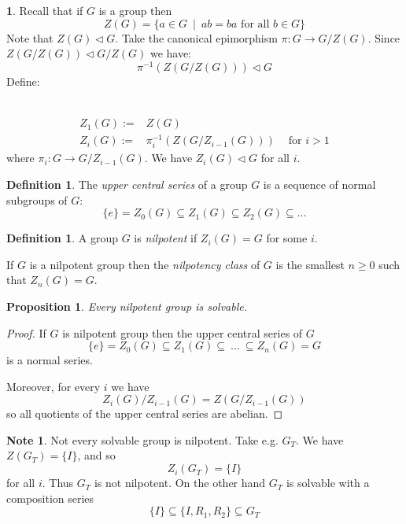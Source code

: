 \documentclass[12pt, letterpaper, oneside]{article}
\theoremstyle{plain}
\newtheorem{proposition}[theorem]{Proposition}
\theoremstyle{definition}
\newtheorem{definition}[theorem]{Definition}
\newtheorem{note}[theorem]{Note}
\newtheorem{nn}[theorem]{}
\newcommand{\vs}{\vskip 5mm}
\begin{document}
\begin{nn} Recall that if $G$ is a group then 
$$Z(G) = \{ a\in G \ \mid \  ab=ba \text{ for all } b\in G \}$$
Note that $Z(G)\lhd G$. Take the canonical epimorphism  $\pi\colon G \to G/ Z(G)$. 
Since $Z\left( G/Z(G)\right)\lhd G/Z(G)$ we have:
 $$\pi^{-1}\left(Z\left( G/Z(G)\right)\right) \lhd G$$
Define:

\vskip -13mm

\ 
\begin{align*}
Z_{1}(G) := & Z(G) \\
Z_{i}(G) :=  & \pi_{i}^{-1}\left(Z\left( G/Z_{i-1}(G)\right)\right) \ \ \  \ \text{ for } i>1
\end{align*}
where $\pi_{i}\colon G \to G/Z_{i-1}(G)$. We have $Z_{i}(G)\lhd G$ for all $i$.
\end{nn}


\vs\vs

\begin{definition}
The \emph{upper central series} of a group $G$ is a sequence of normal subgroups of $G$:
$$\{ e \} = Z_{0}(G) \subseteq Z_{1}(G) \subseteq Z_{2}(G) \subseteq \dots $$
\end{definition}


\vs\vs

\begin{definition}
A group $G$ is \emph{nilpotent}  if $Z_{i}(G) = G$ for some $i$.

If $G$ is a nilpotent group then the \emph{nilpotency class} of $G$ is the smallest
$n\geq 0$ such that $Z_{n}(G) = G$.
 \end{definition}

\vs\vs



\begin{proposition}
Every nilpotent  group is solvable.  
\end{proposition}


\begin{proof}
If $G$ is nilpotent group then the upper central series of $G$
$$\{ e \} = Z_{0}(G) \subseteq Z_{1}(G) \subseteq\  \dots \ \subseteq Z_{n}(G) = G $$
is a normal series. 

Moreover, for every $i$ we have
$$Z_{i}(G)/Z_{i-1}(G) = Z(G/Z_{i-1}(G))$$ 
so all quotients of the upper central series are abelian. 
\end{proof}

\vs\vs

\begin{note}
\label{NOTE_SOLVABLE_NOT_NILPOTENT}
Not every solvable group is nilpotent. Take e.g. $G_{T}$. We have $Z(G_{T}) = \{I\}$, and so 
$$Z_{i}(G_{T}) = \{I \}$$
for all $i$. Thus $G_{T}$ is not nilpotent. On the other hand $G_{T}$ is solvable with a composition series 
$$\{I\} \subseteq \{I, R_{1}, R_{2}\} \subseteq G_{T}$$
\end{note}
\end{document}
